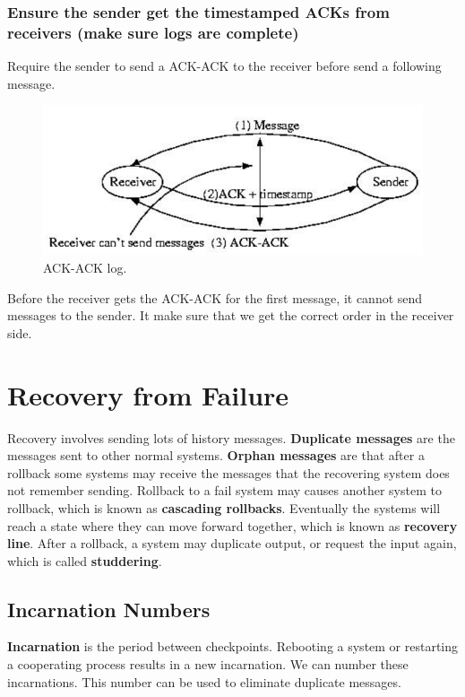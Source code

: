 \subsubsection{Ensure the sender get the timestamped ACKs from receivers (make sure logs are complete)}

Require the sender to send a ACK-ACK to the receiver before send a following message. 
\begin{figure}
\centering
\includegraphics[width=\textwidth]{img/ch03-log_ackack.png}
\caption{ACK-ACK log.}
\label{fig:ch03-log_ackack}
\end{figure}

Before the receiver gets the ACK-ACK for the first message, it cannot send messages to the sender. It make sure that we get the correct order in the receiver side.

\section{Recovery from Failure}
Recovery involves sending lots of history messages. \textbf{Duplicate messages} are the messages sent to other normal systems. \textbf{Orphan messages} are that after a rollback some systems may receive the messages that the recovering system does not remember sending. Rollback to a fail system may causes another system to rollback, which is known as \textbf{cascading rollbacks}. Eventually the systems will reach a state where they can move forward together, which is known as \textbf{recovery line}. After a rollback, a system may duplicate output, or request the input again, which is called \textbf{studdering}.

\subsection{Incarnation Numbers}
\textbf{Incarnation} is the period between checkpoints. Rebooting a system or restarting a cooperating process results in a new incarnation. We can number these incarnations. This number can be used to eliminate duplicate messages.

